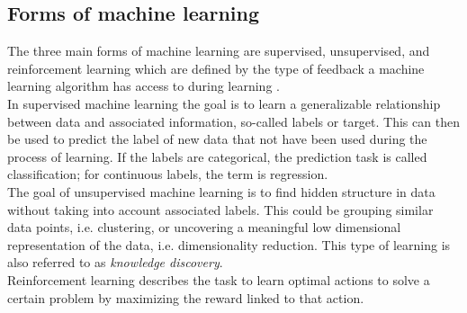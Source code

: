 \subsection{Forms of machine learning}
The three main forms of machine learning are supervised, unsupervised, and reinforcement learning which are defined by the type of feedback a machine learning algorithm has access to during learning \cite{Shalev2014}.\\
In supervised machine learning the goal is to learn a generalizable relationship between data and associated information, so-called labels or target. This can then be used to predict the label of new data that not have been used during the process of learning. If the labels are categorical, the prediction task is called classification; for continuous labels, the term is regression.\\
The goal of unsupervised machine learning is to find hidden structure in data without taking into account associated labels. This could be grouping similar data points, i.e. clustering, or uncovering a meaningful low dimensional representation of the data, i.e. dimensionality reduction. This type of learning is also referred to as \textit{knowledge discovery}\cite{Murphy2012}.\\
Reinforcement learning describes the task to learn optimal actions to solve a certain problem by maximizing the reward linked to that action.





